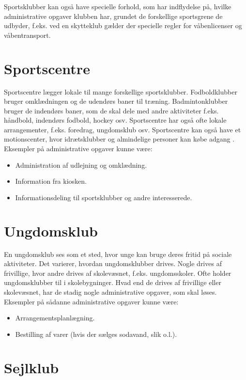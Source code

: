 Sportsklubber kan også have specielle forhold, som har indflydelse på, hvilke administrative opgaver klubben har, grundet de forskellige sportsgrene de udbyder, f.eks. ved en skytteklub gælder der specielle regler for våbenlicenser og våbentransport.

\section{Sportscentre}

Sportscentre lægger lokale til mange forskellige sportsklubber.
Fodboldklubber bruger omklædningen og de udendørs baner til træning. 
Badmintonklubber bruger de indendørs baner, som de skal dele med andre aktiviteter f.eks. håndbold, indendørs fodbold, hockey osv.
Sportscentre har også ofte lokale arrangementer, f.eks. foredrag, ungdomsklub osv.
Sportscentre kan også have et motionscenter, hvor idrætsklubber og almindelige personer kan købe adgang \citep{spt_hal}. 
Eksempler på administrative opgaver kunne være:

\begin{itemize}
  \item Administration af udlejning og omklædning.
  \item Information fra kiosken.
  \item Informationsdeling til sportsklubber og andre interesserede.
\end{itemize}


\section{Ungdomsklub}

En ungdomsklub ses som et sted, hvor unge kan bruge deres fritid på sociale aktiviteter.
Det varierer, hvordan ungdomsklubber drives. 
Nogle drives af frivillige, hvor andre drives af skolevæsnet, f.eks. ungdomsskoler\citep{ung1}.
Ofte holder ungdomsklubber til i skolebygninger. 
Hvad end de drives af frivillige eller skolevæsnet, har de stadig nogle administrative opgaver, som skal løses. 
Eksempler på sådanne administrative opgaver kunne være:

\begin{itemize}
  \item Arrangementsplanlægning.
  \item Bestilling af varer (hvis der sælges sodavand, slik o.l.).
\end{itemize}


\section{Sejlklub}

